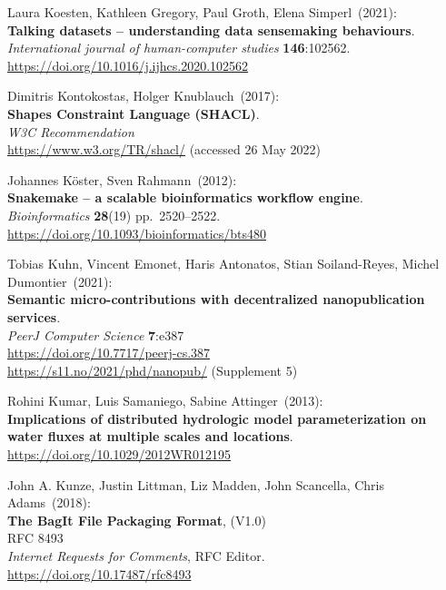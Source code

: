 \begin{thebibliography}{9}
Laura Koesten, Kathleen Gregory, Paul Groth, Elena Simperl~(2021): \\
\textbf{Talking datasets -- understanding data sensemaking
behaviours}.\\
\emph{International journal of human-computer studies}
\textbf{146}:102562.\\
\url{https://doi.org/10.1016/j.ijhcs.2020.102562}

Dimitris Kontokostas, Holger Knublauch~(2017): \\
\textbf{Shapes {Constraint Language} ({SHACL})}.\\
\emph{W3C Recommendation}\\
\url{https://www.w3.org/TR/shacl/} (accessed 26 May 2022)

Johannes Köster, Sven Rahmann~(2012): \\
\textbf{Snakemake -- a scalable bioinformatics workflow engine}.\\
\emph{Bioinformatics} \textbf{28}(19) pp.~2520--2522.\\
\url{https://doi.org/10.1093/bioinformatics/bts480}

Tobias Kuhn, Vincent Emonet, Haris Antonatos, Stian
Soiland-Reyes, Michel Dumontier~(2021): \\
\textbf{Semantic micro-contributions
with decentralized nanopublication services}.\\
\emph{PeerJ Computer Science} \textbf{7}:e387\\
\url{https://doi.org/10.7717/peerj-cs.387} \\
\url{https://s11.no/2021/phd/nanopub/} (Supplement 5)

Rohini Kumar, Luis Samaniego, Sabine Attinger~(2013): \\
\textbf{Implications of distributed hydrologic model parameterization on
water fluxes at multiple scales and locations}.\\
\url{https://doi.org/10.1029/2012WR012195}

John A. Kunze, Justin Littman, Liz Madden, John Scancella, Chris Adams~(2018): \\
\textbf{The BagIt File Packaging Format}, (V1.0)\\
RFC 8493\\
\emph{Internet Requests for Comments}, RFC Editor.\\
\url{https://doi.org/10.17487/rfc8493}


\end{thebibliography}
